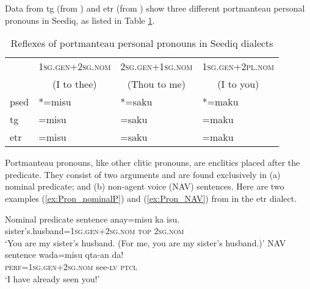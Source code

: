 Data from \acl{tg} (from \cite[62]{Sung2018Sedgrammar}) and \acl{etr} (from \cite[74]{Lee2018Trugrammar}) show three different portmanteau personal pronouns in Seediq, as listed in Table \ref{tab:porref}.

\begin{table}[!htbp]
\centering
\caption{Reflexes of portmanteau personal pronouns in Seediq dialects}
\label{tab:porref}
\begin{tabular}{llll}
\hline
                     & \textsc{1sg.gen+2sg.nom}                 & \textsc{2sg.gen+1sg.nom}                  & \textsc{1sg.gen+2pl.nom}                \\ 
\multicolumn{1}{c}{} & \multicolumn{1}{c}{(I to thee)} & \multicolumn{1}{c}{(Thou to me)} & \multicolumn{1}{c}{(I to you)} \\ \hline
\acl{psed}               & *=misu                          & *=saku                           & *=maku                         \\
\acs{tg}                 & =misu                           & =saku                            & =maku                          \\
\acs{etr}                & =misu                           & =saku                            & =maku          \\ \hline                
\end{tabular}
\end{table}

Portmanteau pronouns, like other clitic pronouns, are enclitics placed after the predicate. They consist of two arguments and are found exclusively in (a) nominal predicate; and (b) non-agent voice (NAV) sentences. Here are two examples (\ref{ex:Pron_nominalP}) and (\ref{ex:Pron_NAV}) from \textcite[74--75]{Lee2018Trugrammar} in the \acl{etr} dialect.

\begin{exe}

    \ex Nominal predicate sentence \label{ex:Pron_nominalP}
    \gll anay=misu ka isu. \\
    sister's.husband=\textsc{1sg.gen+2sg.nom} \textsc{top} \textsc{2sg.nom}\\
    \glt `You are my sister's husband. (For me, you are my sister's husband.)'
    \ex NAV sentence \label{ex:Pron_NAV}
    \gll wada=misu qta-an da! \\
    \textsc{perf}=\textsc{1sg.gen+2sg.nom} see-\textsc{lv} \textsc{ptcl}\\
    \glt `I have already seen you!'
\end{exe}

